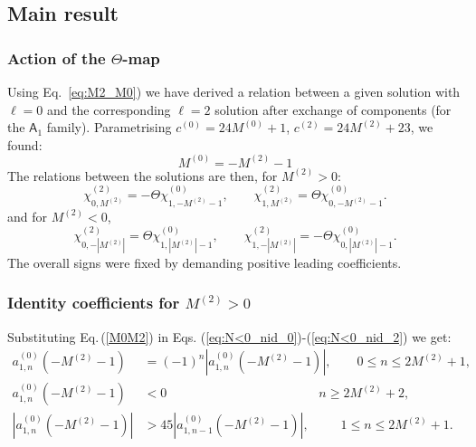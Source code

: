 \documentclass[11pt]{article}
\newcommand\be{\begin{equation}}
\newcommand\ee{\end{equation}}
\newcommand\mA{{\mathsf A}}
\newcommand{\eref}[1]{Eq.\,(\ref{#1})}
\begin{document}
\subsection{Main result}

\subsubsection{Action of the \(\Theta\)-map}

Using Eq.~\eqref{eq:M2_M0}) we have derived a relation between a given solution with $\ell=0$ and the corresponding $\ell=2$ solution after exchange of components (for the $\mA_1$ family). Parametrising $c^{(0)}=24M^{(0)}+1$, $c^{(2)}=24M^{(2)}+23$, we found:
\be
M^{(0)}=-M^{(2)}-1
\label{M0M2}
\ee
The relations between the solutions are then, for \(M^{(2)}>0\):
\begin{equation}
        \chi^{(2)}_{0,M^{(2)}}
        =
        -\Theta\chi^{(0)}_{1,-M^{(2)}-1},
        \qquad
        \chi^{(2)}_{1,M^{(2)}}
        =
        \Theta\chi^{(0)}_{0,-M^{(2)}-1}.
\label{eq:Theta-M-positive}
\end{equation}
and for \(M^{(2)}<0\),
\begin{equation}
        \chi^{(2)}_{0,-|M^{(2)}|}
        =
        \Theta\chi^{(0)}_{1,|M^{(2)}|-1},
        \qquad
        \chi^{(2)}_{1,-|M^{(2)}|}
        =
        -\Theta\chi^{(0)}_{0,|M^{(2)}|-1}.
\label{eq:Theta-M-negative}
\end{equation}
The overall signs were fixed by demanding positive leading coefficients. 


\subsubsection{Identity coefficients for \(M^{(2)}>0\)}

Substituting \eref{M0M2} in Eqs. (\ref{eq:N<0_nid_0})-(\ref{eq:N<0_nid_2}) we get:
\be
\begin{split}
a^{(0)}_{1,n}(-M^{(2)}-1)
&=(-1)^n |a^{(0)}_{1,n}(-M^{(2)}-1)|,
\qquad
0\le n\le2M^{(2)}+1,\\
a^{(0)}_{1,n}(-M^{(2)}-1)&<0
\qquad\qquad\qquad\qquad\qquad\quad\quad n\ge 2M^{(2)}+2, \\
|a^{(0)}_{1,n}(-M^{(2)}-1)|&>45|a^{(0)}_{1,n-1}(-M^{(2)}-1)|,
\qquad\,\,\, 1\le n\le2M^{(2)}+1.
\end{split}
\ee
\end{document}
